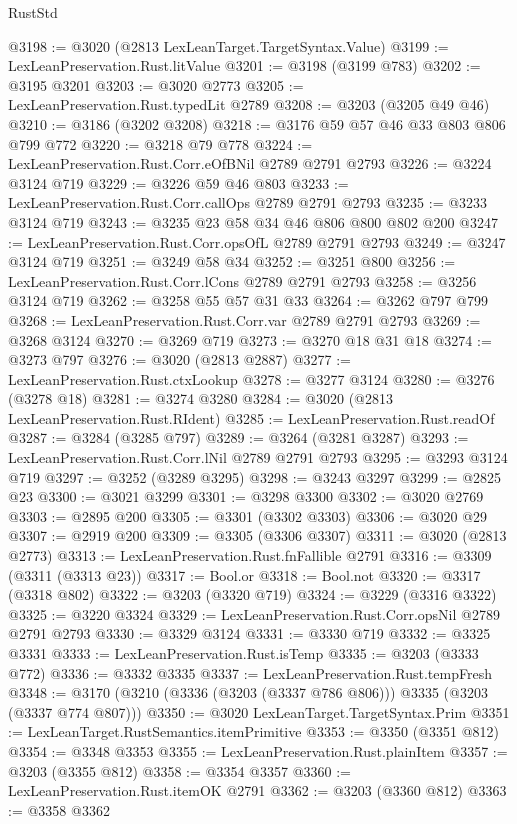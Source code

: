 \begin{lexlean}{RustStd}
\begin{coremodule}
{\begin{coremodule}
{{{{{{{{{{{{{{{@3198 := @3020 (@2813 LexLeanTarget.TargetSyntax.Value)
@3199 := LexLeanPreservation.Rust.litValue
@3201 := @3198 (@3199 @783)
@3202 := @3195 @3201
@3203 := @3020 @2773
@3205 := LexLeanPreservation.Rust.typedLit @2789
@3208 := @3203 (@3205 @49 @46)
@3210 := @3186 (@3202 @3208)
@3218 := @3176 @59 @57 @46 @33 @803 @806 @799 @772
@3220 := @3218 @79 @778
@3224 := LexLeanPreservation.Rust.Corr.eOfBNil @2789 @2791 @2793
@3226 := @3224 @3124 @719
@3229 := @3226 @59 @46 @803
@3233 := LexLeanPreservation.Rust.Corr.callOps @2789 @2791 @2793
@3235 := @3233 @3124 @719
@3243 := @3235 @23 @58 @34 @46 @806 @800 @802 @200
@3247 := LexLeanPreservation.Rust.Corr.opsOfL @2789 @2791 @2793
@3249 := @3247 @3124 @719
@3251 := @3249 @58 @34
@3252 := @3251 @800
@3256 := LexLeanPreservation.Rust.Corr.lCons @2789 @2791 @2793
@3258 := @3256 @3124 @719
@3262 := @3258 @55 @57 @31 @33
@3264 := @3262 @797 @799
@3268 := LexLeanPreservation.Rust.Corr.var @2789 @2791 @2793
@3269 := @3268 @3124
@3270 := @3269 @719
@3273 := @3270 @18 @31 @18
@3274 := @3273 @797
@3276 := @3020 (@2813 @2887)
@3277 := LexLeanPreservation.Rust.ctxLookup
@3278 := @3277 @3124
@3280 := @3276 (@3278 @18)
@3281 := @3274 @3280
@3284 := @3020 (@2813 LexLeanPreservation.Rust.RIdent)
@3285 := LexLeanPreservation.Rust.readOf
@3287 := @3284 (@3285 @797)
@3289 := @3264 (@3281 @3287)
@3293 := LexLeanPreservation.Rust.Corr.lNil @2789 @2791 @2793
@3295 := @3293 @3124 @719
@3297 := @3252 (@3289 @3295)
@3298 := @3243 @3297
@3299 := @2825 @23
@3300 := @3021 @3299
@3301 := @3298 @3300
@3302 := @3020 @2769
@3303 := @2895 @200
@3305 := @3301 (@3302 @3303)
@3306 := @3020 @29
@3307 := @2919 @200
@3309 := @3305 (@3306 @3307)
@3311 := @3020 (@2813 @2773)
@3313 := LexLeanPreservation.Rust.fnFallible @2791
@3316 := @3309 (@3311 (@3313 @23))
@3317 := Bool.or
@3318 := Bool.not
@3320 := @3317 (@3318 @802)
@3322 := @3203 (@3320 @719)
@3324 := @3229 (@3316 @3322)
@3325 := @3220 @3324
@3329 := LexLeanPreservation.Rust.Corr.opsNil @2789 @2791 @2793
@3330 := @3329 @3124
@3331 := @3330 @719
@3332 := @3325 @3331
@3333 := LexLeanPreservation.Rust.isTemp
@3335 := @3203 (@3333 @772)
@3336 := @3332 @3335
@3337 := LexLeanPreservation.Rust.tempFresh
@3348 := @3170 (@3210 (@3336 (@3203 (@3337 @786 @806))) @3335 (@3203 (@3337 @774 @807)))
@3350 := @3020 LexLeanTarget.TargetSyntax.Prim
@3351 := LexLeanTarget.RustSemantics.itemPrimitive
@3353 := @3350 (@3351 @812)
@3354 := @3348 @3353
@3355 := LexLeanPreservation.Rust.plainItem
@3357 := @3203 (@3355 @812)
@3358 := @3354 @3357
@3360 := LexLeanPreservation.Rust.itemOK @2791
@3362 := @3203 (@3360 @812)
@3363 := @3358 @3362
}}}}}}}}}}}}}}}
\end{coremodule}}
\end{coremodule}
\end{lexlean}
